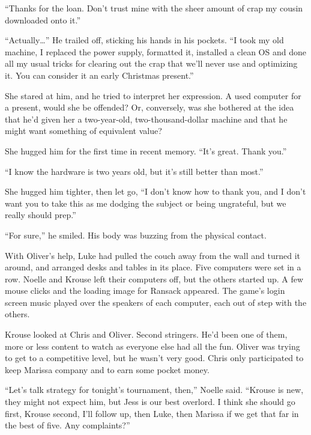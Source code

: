 ``Thanks for the loan.  Don't trust mine with the sheer amount of crap my cousin downloaded onto it.''



``Actually\ldots'' He trailed off, sticking his hands in his pockets.  ``I took my old machine, I replaced the power supply, formatted it, installed a clean OS and done all my usual tricks for clearing out the crap that we'll never use and optimizing it.  You can consider it an early Christmas present.''



She stared at him, and he tried to interpret her expression.  A used computer for a present, would she be offended?  Or, conversely, was she bothered at the idea that he'd given her a two-year-old, two-thousand-dollar machine and that he might want something of equivalent value?



She hugged him for the first time in recent memory.  ``It's great.  Thank you.''



``I know the hardware is two years old, but it's still better than most.''



She hugged him tighter, then let go, ``I don't know how to thank you, and I don't want you to take this as me dodging the subject or being ungrateful, but we really should prep.''



``For sure,'' he smiled.  His body was buzzing from the physical contact.



With Oliver's help, Luke had pulled the couch away from the wall and turned it around, and arranged desks and tables in its place.  Five computers were set in a row.  Noelle and Krouse left their computers off, but the others started up.  A few mouse clicks and the loading image for Ransack appeared.  The game's login screen music played over the speakers of each computer, each out of step with the others.



Krouse looked at Chris and Oliver.  Second stringers.  He'd been one of them, more or less content to watch as everyone else had all the fun.  Oliver was trying to get to a competitive level, but he wasn't very good.  Chris only participated to keep Marissa company and to earn some pocket money.



``Let's talk strategy for tonight's tournament, then,'' Noelle said.  ``Krouse is new, they might not expect him, but Jess is our best overlord.  I think she should go first, Krouse second, I'll follow up, then Luke, then Marissa if we get that far in the best of five.  Any complaints?''



